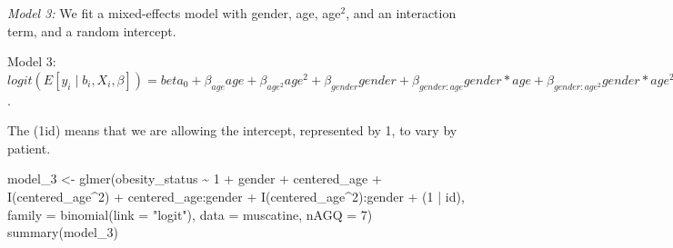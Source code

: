\documentclass[
  letterpaper,
  DIV=11,
  numbers=noendperiod]{scrreprt}
\newenvironment{Shaded}{\begin{snugshade}}{\end{snugshade}}
\newcommand{\AttributeTok}[1]{\textcolor[rgb]{0.40,0.45,0.13}{#1}}
\newcommand{\DecValTok}[1]{\textcolor[rgb]{0.68,0.00,0.00}{#1}}
\newcommand{\FunctionTok}[1]{\textcolor[rgb]{0.28,0.35,0.67}{#1}}
\newcommand{\NormalTok}[1]{\textcolor[rgb]{0.00,0.23,0.31}{#1}}
\newcommand{\OtherTok}[1]{\textcolor[rgb]{0.00,0.23,0.31}{#1}}
\newcommand{\SpecialCharTok}[1]{\textcolor[rgb]{0.37,0.37,0.37}{#1}}
\newcommand{\StringTok}[1]{\textcolor[rgb]{0.13,0.47,0.30}{#1}}
\begin{document}
\emph{Model 3:} We fit a mixed-effects model with gender, age,
age\(^2\), and an interaction term, and a random intercept.

Model 3:
\(logit(E[y_{i} \mid b_i, X_i, \beta])= beta_{0} + \beta_{age}age + \beta_{age^2}age^2 + \beta_{gender}gender + \beta_{gender:age}gender*age + \beta_{gender:age^2}gender*age^2 + b_{0,i}\).

The (1\textbar id) means that we are allowing the intercept, represented
by 1, to vary by patient.

\begin{Shaded}
\begin{Highlighting}[]
\NormalTok{model\_3 }\OtherTok{\textless{}{-}} \FunctionTok{glmer}\NormalTok{(obesity\_status }\SpecialCharTok{\textasciitilde{}} \DecValTok{1} \SpecialCharTok{+}\NormalTok{ gender }\SpecialCharTok{+}\NormalTok{ centered\_age }\SpecialCharTok{+} \FunctionTok{I}\NormalTok{(centered\_age}\SpecialCharTok{\^{}}\DecValTok{2}\NormalTok{) }\SpecialCharTok{+}
\NormalTok{    centered\_age}\SpecialCharTok{:}\NormalTok{gender }\SpecialCharTok{+} \FunctionTok{I}\NormalTok{(centered\_age}\SpecialCharTok{\^{}}\DecValTok{2}\NormalTok{)}\SpecialCharTok{:}\NormalTok{gender }\SpecialCharTok{+}\NormalTok{ (}\DecValTok{1} \SpecialCharTok{|}\NormalTok{ id), }\AttributeTok{family =} \FunctionTok{binomial}\NormalTok{(}\AttributeTok{link =} \StringTok{"logit"}\NormalTok{),}
    \AttributeTok{data =}\NormalTok{ muscatine, }\AttributeTok{nAGQ =} \DecValTok{7}\NormalTok{)}
\FunctionTok{summary}\NormalTok{(model\_3)}
\end{Highlighting}
\end{Shaded}
\end{document}
